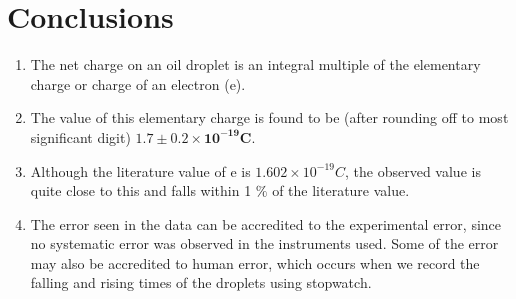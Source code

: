 \documentclass[%
 reprint,
 amsmath,amssymb,
 aps,
]{revtex4-2}
\begin{document}
\section{Conclusions}
\begin{enumerate}
    \item The  net  charge  on  an  oil  droplet  is  an  integral multiple of the elementary charge or charge of an electron (e).
    \item The value of this elementary charge is found to be (after rounding off to most significant digit) $\mathbf{1.7\pm 0.2\times 10^{-19}  C}$.
    \item Although the literature value of e is $1.602 \times 10^{-19} C$, the observed value is quite close to this and falls within 1 $\%$ of the literature value.
    \item The error seen in the data can be accredited to the experimental error, since no systematic error was observed in the instruments used. Some of the error may also be accredited to human error, which occurs when we record the falling and rising times of the droplets using stopwatch.
\end{enumerate}





\end{document}
